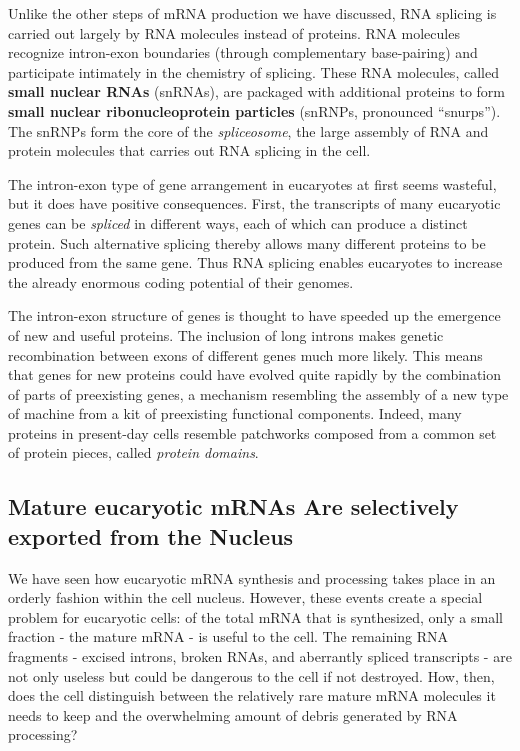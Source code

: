 Unlike the other steps of mRNA production we have discussed, RNA
splicing is carried out largely by RNA molecules instead of proteins. RNA
molecules recognize intron-exon boundaries (through complementary
base-pairing) and participate intimately in the chemistry of splicing.
These RNA molecules, called \textbf{small nuclear RNAs} (snRNAs), are packaged
with additional proteins to form \textbf{small nuclear ribonucleoprotein
particles} (snRNPs, pronounced “snurps”). The snRNPs form the core of
the \textit{spliceosome}, the large assembly of RNA and protein molecules that
carries out RNA splicing in the cell.

The intron-exon type of gene arrangement in eucaryotes at first seems
wasteful, but it does have positive consequences. First, the transcripts of
many eucaryotic genes can be \textit{spliced} in different ways, each of which
can produce a distinct protein. Such alternative splicing thereby allows
many different proteins to be produced from the same gene.
Thus RNA splicing enables eucaryotes to increase the already enormous
coding potential of their genomes.

The intron-exon structure of genes is thought to have speeded up the emergence of new and
useful proteins. The inclusion of long introns makes genetic recombination
between exons of different genes much more likely. This means that
genes for new proteins could have evolved quite rapidly by the combination
of parts of preexisting genes, a mechanism resembling the assembly
of a new type of machine from a kit of preexisting functional components.
Indeed, many proteins in present-day cells resemble patchworks
composed from a common set of protein pieces, called \textit{protein domains}.

\subsection{Mature eucaryotic mRNAs Are selectively exported from the Nucleus}

We have seen how eucaryotic mRNA synthesis and processing takes
place in an orderly fashion within the cell nucleus. However, these events
create a special problem for eucaryotic cells: of the total mRNA that is
synthesized, only a small fraction - the mature mRNA - is useful to the
cell. The remaining RNA fragments - excised introns, broken RNAs, and
aberrantly spliced transcripts - are not only useless but could be dangerous
to the cell if not destroyed. How, then, does the cell distinguish
between the relatively rare mature mRNA molecules it needs to keep and
the overwhelming amount of debris generated by RNA processing?

